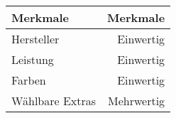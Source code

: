 \setlength{\extrarowheight}{2pt}

\begin{tabular}{|lr|}
\rowcolor{heading}\color{white}\textbf{Merkmale} &
\color{white}\textbf{Merkmale} \\
\hline
Hersteller & Einwertig\\
Leistung & Einwertig\\
Farben & Einwertig\\
Wählbare Extras & Mehrwertig\\
\hline
\end{tabular}
